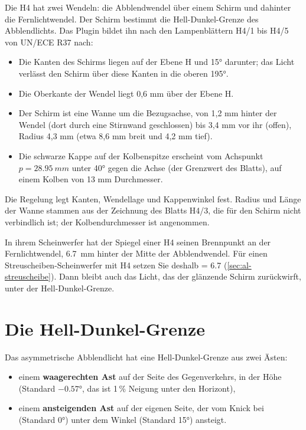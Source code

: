Die H4 hat zwei Wendeln: die Abblendwendel über einem Schirm und dahinter die Fernlichtwendel. Der
Schirm bestimmt die Hell-Dunkel-Grenze des Abblendlichts. Das Plugin bildet ihn nach den
Lampenblättern H4/1 bis H4/5 von UN/ECE R37 nach:

\begin{itemize}
  \item Die Kanten des Schirms liegen auf der Ebene H und \ang{15} darunter; das Licht verlässt den
    Schirm über diese Kanten in die oberen \ang{195}.
  \item Die Oberkante der Wendel liegt 0,6 mm über der Ebene H.
  \item Der Schirm ist eine Wanne um die Bezugsachse, von 1,2 mm hinter der Wendel (dort durch eine
    Stirnwand geschlossen) bis 3,4 mm vor ihr (offen), Radius 4,3 mm (etwa 8,6 mm breit und 4,2 mm
    tief).
  \item Die schwarze Kappe auf der Kolbenspitze erscheint vom Achspunkt $p = \qty{28.95}{mm}$
    unter \ang{40} gegen die Achse (der Grenzwert des Blatts), auf einem Kolben von 13 mm
    Durchmesser.
\end{itemize}

Die Regelung legt Kanten, Wendellage und Kappenwinkel fest. Radius und Länge der Wanne stammen aus
der Zeichnung des Blatts H4/3, die für den Schirm nicht verbindlich ist; der Kolbendurchmesser ist
angenommen.

\begin{tipp}
In ihrem Scheinwerfer hat der Spiegel einer H4 seinen Brennpunkt an der Fernlichtwendel,
\qty{6.7}{mm} hinter der Mitte der Abblendwendel. Für einen Streuscheiben-Scheinwerfer mit H4 setzen
Sie deshalb  = 6.7 (\autoref{sec:al-streuscheibe}).
Dann bleibt auch das Licht, das der glänzende Schirm zurückwirft, unter der Hell-Dunkel-Grenze.
\end{tipp}

\section{Die Hell-Dunkel-Grenze}\label{sec:al-cutoff}

Das asymmetrische Abblendlicht hat eine Hell-Dunkel-Grenze aus zwei Ästen:

\begin{itemize}
  \item einem \textbf{waagerechten Ast} auf der Seite des Gegenverkehrs, in der Höhe
     (Standard $-\ang{0.57}$, das ist 1\,\% Neigung unter den Horizont),
  \item einem \textbf{ansteigenden Ast} auf der eigenen Seite, der vom Knick bei 
    (Standard \ang{0}) unter dem Winkel  (Standard \ang{15}) ansteigt.
\end{itemize}

